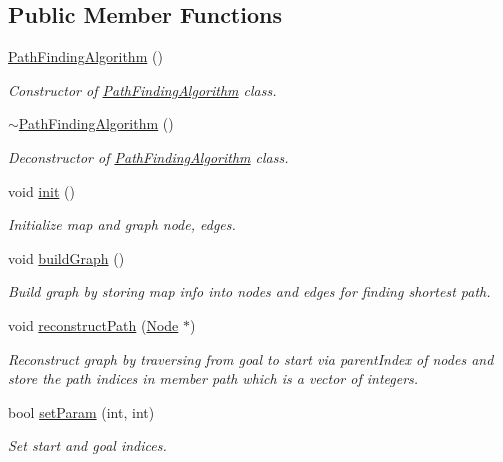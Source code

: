 \subsection*{Public Member Functions}
\begin{DoxyCompactItemize}
\item 
\hyperlink{classPathFindingAlgorithm_ad9af1fa0b8bb6dc6660219c0b21a3749}{Path\-Finding\-Algorithm} ()
\begin{DoxyCompactList}\small\item\em Constructor of \hyperlink{classPathFindingAlgorithm}{Path\-Finding\-Algorithm} class. \end{DoxyCompactList}\item 
\hyperlink{classPathFindingAlgorithm_a68fdd88d9348febf0e1814af9add5ca3}{$\sim$\-Path\-Finding\-Algorithm} ()
\begin{DoxyCompactList}\small\item\em Deconstructor of \hyperlink{classPathFindingAlgorithm}{Path\-Finding\-Algorithm} class. \end{DoxyCompactList}\item 
void \hyperlink{classPathFindingAlgorithm_a31b4a12fa7164f0f71649f0505c8031e}{init} ()
\begin{DoxyCompactList}\small\item\em Initialize map and graph node, edges. \end{DoxyCompactList}\item 
void \hyperlink{classPathFindingAlgorithm_a71b876665f35f458137ff9f2347fcc54}{build\-Graph} ()
\begin{DoxyCompactList}\small\item\em Build graph by storing map info into nodes and edges for finding shortest path. \end{DoxyCompactList}\item 
void \hyperlink{classPathFindingAlgorithm_a334c5cfc5b40a1e8458eb960ff5f541c}{reconstruct\-Path} (\hyperlink{classNode}{Node} $\ast$)
\begin{DoxyCompactList}\small\item\em Reconstruct graph by traversing from goal to start via parent\-Index of nodes and store the path indices in member path which is a vector of integers. \end{DoxyCompactList}\item 
bool \hyperlink{classPathFindingAlgorithm_a2b48e12615aecc6fd952efcb5d920864}{set\-Param} (int, int)
\begin{DoxyCompactList}\small\item\em Set start and goal indices. \end{DoxyCompactList}\item 

\end{DoxyCompactItemize}
